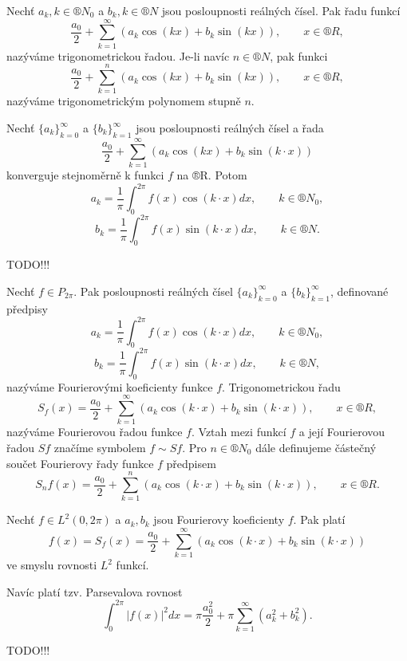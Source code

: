 \documentclass[12pt]{article}					%
\begin{document}
	\begin{definice}
		Nechť $a_k, k \in ®N_0$ a $b_k, k \in ®N$ jsou posloupnosti reálných čísel. Pak řadu funkcí
		$$ \frac{a_0}{2} + \sum_{k=1}^∞ (a_k \cos(k x) + b_k \sin(k x)), \qquad x \in ®R, $$
		nazýváme trigonometrickou řadou. Je-li navíc $n \in ®N$, pak funkci
		$$ \frac{a_0}{2} + \sum_{k=1}^n (a_k \cos(k x) + b_k \sin(k x)), \qquad x \in ®R, $$
		nazýváme trigonometrickým polynomem stupně $n$.
	\end{definice}

	\begin{veta}
		Nechť $\{a_k\}_{k=0}^∞$ a $\{b_k\}_{k=1}^∞$ jsou posloupnosti reálných čísel a řada
		$$ \frac{a_0}{2} + \sum_{k=1}^∞(a_k \cos(k x) + b_k \sin (k·x)) $$
		konverguje stejnoměrně k funkci $f$ na ®R. Potom
		$$ a_k = \frac{1}{\pi} \int_0^{2\pi} f(x) \cos(k·x) dx, \qquad k \in ®N_0, $$
		$$ b_k = \frac{1}{\pi} \int_0^{2\pi} f(x) \sin(k·x) dx, \qquad k \in ®N. $$

		\begin{dukazin}
			TODO!!!
		\end{dukazin}
	\end{veta}

	\begin{definice}
		Nechť $f \in P_{2\pi}$. Pak posloupnosti reálných čísel $\{a_k\}_{k=0}^∞$ a $\{b_k\}_{k=1}^∞$, definované předpisy
		$$ a_k = \frac{1}{\pi} \int_0^{2\pi} f(x) \cos(k·x) dx, \qquad k \in ®N_0, $$
		$$ b_k = \frac{1}{\pi} \int_0^{2\pi} f(x) \sin(k·x) dx, \qquad k \in ®N, $$
		nazýváme Fourierovými koeficienty funkce $f$. Trigonometrickou řadu
		$$ S_f(x) = \frac{a_0}{2} + \sum_{k=1}^∞ (a_k \cos(k·x) + b_k \sin(k·x)), \qquad x \in ®R, $$
		nazýváme Fourierovou řadou funkce $f$. Vztah mezi funkcí $f$ a její Fourierovou řadou $S f$ značíme symbolem $f \sim S f$. Pro $n \in ®N_0$ dále definujeme částečný součet Fourierovy řady funkce $f$ předpisem
		$$ S_n f(x) = \frac{a_0}{2} + \sum_{k=1}^n (a_k \cos(k·x) + b_k \sin(k·x)), \qquad x \in ®R. $$
	\end{definice}
	
	\begin{dusledek}
		Nechť $f \in L^2(0, 2\pi)$ a $a_k, b_k$ jsou Fourierovy koeficienty $f$. Pak platí
		$$ f(x) = S_f(x) = \frac{a_0}{2} + \sum_{k=1}^∞ (a_k \cos(k·x) + b_k \sin(k·x)) $$
		ve smyslu rovnosti $L^2$ funkcí.

		Navíc platí tzv. Parsevalova rovnost
		$$ \int_0^{2\pi} |f(x)|^2 dx = \pi \frac{a_0^2}{2} + \pi \sum_{k=1}^∞ (a_k^2 + b_k^2). $$

		\begin{dukazin}
			TODO!!!
		\end{dukazin}
	\end{dusledek}
\end{document}
